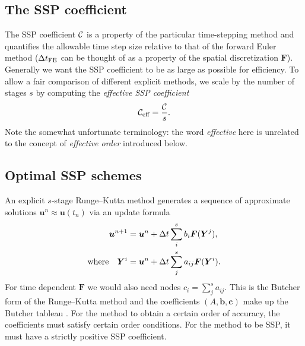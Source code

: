 \subsection{The SSP coefficient}

The SSP coefficient $\mathcal{C}$ is a property of the particular time-stepping method and quantifies the allowable time step size relative to that of the forward Euler method
($\Delta t_{\text{FE}}$ can be thought of as a property of the spatial discretization $\bm{F}$).
Generally we want the SSP coefficient to be as large as possible for efficiency.
To allow a fair comparison of different explicit methods, we scale by the number of stages $s$ by computing the \emph{effective SSP coefficient}
$$\mathcal{C}_{\text{eff}} = \frac{\mathcal{C}}{s}.$$
Note the somewhat unfortunate terminology: the word \emph{effective} here is unrelated to the concept of \emph{effective order} introduced below.


\subsection{Optimal SSP schemes}
\label{subsec:Optimal_SSPRK}


An explicit $s$-stage Runge--Kutta method generates a sequence of approximate solutions $\bm{u}^n \approx \bm{u}(t_n)$ via an update formula
\begin{align*}
\bm{u}^{n+1} &= \bm{u}^{n} + \Delta t \sum_i^s b_i \bm{F}(\bm{Y}^j), \\
\text{where} \quad \bm{Y}^{i} &= \bm{u}^{n} + \Delta t \sum_j^s a_{ij} \bm{F}(\bm{Y}^i).
\end{align*}
For time dependent $\bm{F}$ we would also need nodes $c_i =
\sum_j^sa_{ij}$.
This is the Butcher form of the Runge--Kutta method and the
coefficients $(A,\bm{b},\bm{c})$ make up the Butcher tableau
\cite{Butcher2008_book}.
For the method to obtain a certain order of accuracy, the coefficients must satisfy certain order conditions.
For the method to be SSP, it must have a strictly positive SSP
coefficient.

